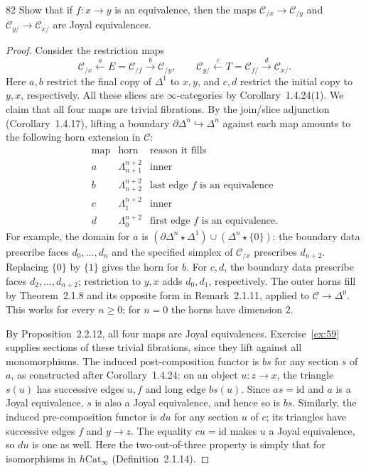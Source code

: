 \begin{exercise}{82}
Show that if $f\colon x\to y$ is an equivalence, then the maps
$\mathcal C_{/x}\to\mathcal C_{/y}$ and $\mathcal C_{y/}\to\mathcal C_{x/}$
are Joyal equivalences.

\begin{proof}
Consider the restriction maps
\[
 \mathcal C_{/x}\xleftarrow{a}E=\mathcal C_{/f}
 \xrightarrow{b}\mathcal C_{/y},
 \qquad
 \mathcal C_{y/}\xleftarrow{c}T=\mathcal C_{f/}
 \xrightarrow{d}\mathcal C_{x/}.
\]
Here $a,b$ restrict the final copy of $\Delta^1$ to $x,y$,
and $c,d$ restrict the initial copy to $y,x$, respectively.
All these slices are $\infty$-categories by
Corollary~1.4.24(1).
We claim that all four maps are trivial fibrations.
By the join/slice adjunction (Corollary~1.4.17), lifting a
boundary $\partial\Delta^n\hookrightarrow\Delta^n$ against
each map amounts to the following horn extension in $\mathcal C$:
\[
\begin{array}{c|c|c}
 \text{map}&\text{horn}&\text{reason it fills}\\[2pt]
 a&\Lambda_{n+1}^{n+2}&\text{inner}\\
 b&\Lambda_{n+2}^{n+2}&\text{last edge }f\text{ is an equivalence}\\
 c&\Lambda_1^{n+2}&\text{inner}\\
 d&\Lambda_0^{n+2}&\text{first edge }f\text{ is an equivalence}.
\end{array}
\]
For example, the domain for $a$ is
$(\partial\Delta^n\star\Delta^1)\cup
(\Delta^n\star\{0\})$:
the boundary data prescribe faces $d_0,\ldots,d_n$ and
the specified simplex of $\mathcal C_{/x}$ prescribes $d_{n+2}$.
Replacing $\{0\}$ by $\{1\}$ gives the horn for $b$.
For $c,d$, the boundary data prescribe faces $d_2,\ldots,d_{n+2}$;
restriction to $y,x$ adds $d_0,d_1$, respectively.
The outer horns fill by Theorem~2.1.8 and its opposite form
in Remark~2.1.11, applied to $\mathcal C\to\Delta^0$.
This works for every $n\geq0$; for $n=0$ the horns have
dimension $2$.

By Proposition~2.2.12, all four maps are Joyal equivalences.
Exercise~\ref{ex:59} supplies sections of these trivial
fibrations, since they lift against all monomorphisms.
The induced post-composition functor is $bs$ for any section
$s$ of $a$, as constructed after Corollary~1.4.24:
on an object $u\colon z\to x$, the triangle $s(u)$ has
successive edges $u,f$ and long edge $bs(u)$.
Since $as=\mathrm{id}$ and $a$ is a Joyal equivalence,
$s$ is also a Joyal equivalence, and hence so is $bs$.
Similarly, the induced pre-composition functor is $du$
for any section $u$ of $c$; its triangles have successive
edges $f$ and $y\to z$.
The equality $cu=\mathrm{id}$ makes $u$ a Joyal equivalence,
so $du$ is one as well.
Here the two-out-of-three property is simply that for
isomorphisms in $h\mathrm{Cat}_\infty$
(Definition~2.1.14).
\end{proof}
\end{exercise}
